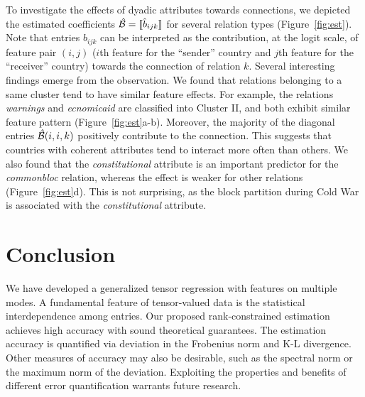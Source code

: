 \documentclass[12pt]{article}
\theoremstyle{plain}
\theoremstyle{definition}
\begin{document}
To investigate the effects of dyadic attributes towards connections, we depicted the estimated coefficients $\hat {\mathcal{B}}=\llbracket \hat b_{ijk} \rrbracket$ for several relation types (Figure~\ref{fig:est}). Note that entries $\hat b_{ijk}$ can be interpreted as the contribution, at the logit scale, of feature pair $(i,j)$ ($i$th feature for the ``sender'' country and $j$th feature for the ``receiver'' country) towards the connection of relation $k$.  Several interesting findings emerge from the observation. We found that relations belonging to a same cluster tend to have similar feature effects. For example, the relations \emph{warnings} and \emph{ecnomicaid} are classified into Cluster II, and both exhibit similar feature pattern (Figure~\ref{fig:est}a-b). Moreover, the majority of the diagonal entries $\hat {\mathcal{B}}(i,i,k)$ positively contribute to the connection. This suggests that countries with coherent attributes tend to interact more often than others. We also found that the \emph{constitutional} attribute is an important predictor for the \emph{commonbloc} relation, whereas the effect is weaker for other relations (Figure~\ref{fig:est}d). This is not surprising, as the block partition during Cold War is associated with the \emph{constitutional} attribute. 


\section{Conclusion}\label{sec:con}

We have developed a generalized tensor regression with features on multiple modes. A fundamental feature of tensor-valued data is the statistical interdependence among entries. Our proposed rank-constrained estimation achieves high accuracy with sound theoretical guarantees. The estimation accuracy is quantified via deviation in the Frobenius norm and K-L divergence. Other measures of accuracy may also be desirable, such as the spectral norm or the maximum norm of the deviation. Exploiting the properties and benefits of different error quantification warrants future research.
 
\end{document}
